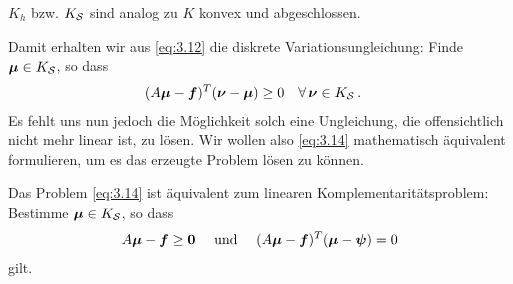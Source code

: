 \begin{bem*}
$K_h$ bzw. $K_{\mathcal S}$ sind analog zu $K$ konvex und abgeschlossen.
\end{bem*}


Damit erhalten wir aus \eqref{eq:3.12} die diskrete Variationsungleichung: Finde $\boldsymbol\mu \in K_{\mathcal S}$, so dass
\begin{align}\label{eq:3.14}
	(A\boldsymbol \mu-\boldsymbol f)^T (\boldsymbol \nu- \boldsymbol\mu) &  \ge 0 \quad \forall \, \boldsymbol \nu \in K_{\mathcal S} \, .
\end{align}
Es fehlt uns nun jedoch die Möglichkeit solch eine Ungleichung, die offensichtlich nicht mehr linear ist, zu lösen. Wir wollen also \eqref{eq:3.14} mathematisch äquivalent formulieren, um es das erzeugte Problem lösen zu können.


 \begin{satz}\label{satz:3.11}
Das Problem \eqref{eq:3.14} ist äquivalent zum linearen Komplementaritätsproblem: Bestimme $\boldsymbol\mu \in K_{\mathcal S}$, so dass
\begin{align}\label{eq:3.15}
	A\boldsymbol\mu - \boldsymbol f \ge \boldsymbol 0\quad\text{ und }\quad (A\boldsymbol\mu-\boldsymbol f)^T(\boldsymbol \mu - \boldsymbol\psi) = 0
\end{align}
gilt.
\end{satz}

